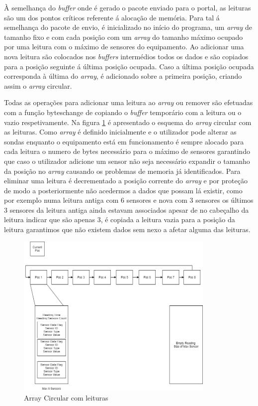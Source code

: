 \par À semelhança do \textit{buffer} onde é gerado o pacote enviado para o portal, as leituras são um dos pontos críticos referente á alocação de memória. Para tal á semelhança do pacote de envio, é inicializado no início do programa, um \textit{array} de tamanho fixo e com cada posição com um \textit{array} do tamanho máximo ocupado por uma leitura com o máximo de sensores do equipamento. Ao adicionar uma nova leitura são colocados nos \textit{buffers} intermédios todos os dados e são copiados para a posição seguinte á última posição ocupada. Caso a última posição ocupada corresponda à última do \textit{array}, é adicionado sobre a primeira posição, criando assim o \textit{array} circular.
\par Todas as operações para adicionar uma leitura ao \textit{array} ou remover são efetuadas com a função byteschange de copiando o \textit{buffer} temporário com a leitura ou o vazio respetivamente. Na figura \ref{circbuf} é apresentado o esquema do \textit{array} circular com as leituras. Como \textit{array} é definido inicialmente e o utilizador pode alterar as sondas enquanto o equipamento está em funcionamento é sempre alocado para cada leitura o numero de bytes necessário para o máximo de sensores garantindo que caso o utilizador adicione um sensor não seja necessário expandir o tamanho da posição no \textit{array} causando os problemas de memoria já identificados. Para eliminar uma leitura é decrementado a posição corrente do \textit{array} e por proteção de modo a posteriormente não acedermos a dados que possam lá existir, como por exemplo numa leitura antiga com 6 sensores e nova com 3 sensores os últimos 3 sensores da leitura antiga ainda estavam associados apesar de no cabeçalho da leitura indicar que são apenas 3, é copiada a leitura vazia para a posição da leitura garantimos que não existem dados sem nexo a afetar alguma das leituras.


\begin{figure}[ht]
\centering
\includegraphics[width=0.85\textwidth]{images/circbuf.png}
\caption{Array Circular com leituras}\label{circbuf}
\end{figure}


